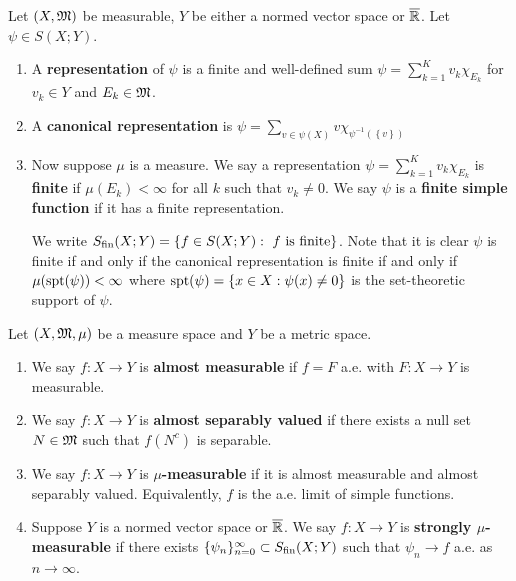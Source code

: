 \documentclass[a4paper]{article}
\begin{document}
\begin{defi}

Let $(X, \mathfrak{M})$ be measurable, $Y$ be either a normed vector
space or $\overline{\mathbb{R}}$. Let $\psi \in S(X; Y)$.
\begin{enumerate}
  \item A \textbf{representation} of $\psi$ is a finite and
  well-defined sum
  $\psi = \sum_{k=1}^K v_k \chi_{E_k}$
  for $v_k \in Y$ and $E_k \in \mathfrak{M}$.

  \item A \textbf{canonical representation} is
  $\psi = \sum_{v \in \psi(X)} v \chi_{\psi^{-1}
  (\left\{ v \right\})}$
  \item Now suppose $\mu$ is a measure.
  We say a representation $\psi = \sum_{k=1}^K
  v_k \chi_{E_k}$ is \textbf{finite} if $\mu(E_k) < \infty$
  for all $k$ such that $v_k \neq 0$. We
  say $\psi$ is a \textbf{finite simple function} if it has a
  finite representation.

  We write $S_{\text{fin}}(X; Y) = \left\{
    f \in S(X; Y) : \text{ $f$ is finite}
   \right\}$.
  Note that it is clear $\psi$ is finite if and only if
  the canonical representation is finite if and only if
  $\mu(\operatorname{spt}(\psi)) < \infty$ where
  $\operatorname{spt}(\psi) = \left\{ x \in X : \psi(x) \neq 0 \right\}$
  is the set-theoretic support of $\psi$.
\end{enumerate}

\end{defi}

\begin{defi}
  Let $(X, \mathfrak{M}, \mu)$ be a measure space and $Y$ be a metric
  space.
  \begin{enumerate}
    \item We say $f : X \to Y$ is \textbf{almost measurable}
    if $f = F$ a.e. with $F: X \to Y$ is measurable.

    \item We say $f : X \to Y$ is \textbf{almost separably valued}
    if there exists a null set $N \in \mathfrak{M}$ such that
    $f(N^c)$ is separable.

    \item We say $f: X \to Y$ is \textbf{$\mu$-measurable} if
    it is almost measurable and almost separably valued.
    Equivalently, $f$ is the a.e. limit of simple functions.

    \item Suppose $Y$ is a normed vector space or $\overline{\mathbb{R}}$.
    We say $f: X \to Y$ is \textbf{strongly $\mu$-measurable}
    if there exists $\{ \psi_n \}_{n=0}^\infty \subset S_{\text{fin}}(X; Y)$
    such that $\psi_n \to f$ a.e. as $n \to \infty$.
  \end{enumerate}
\end{defi}
\end{document}
